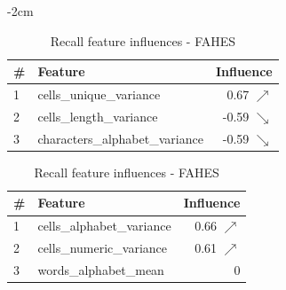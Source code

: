 \begin{table}[H]
	\centering
	\addtolength{\leftskip} {-2cm}
	\addtolength{\rightskip}{-2cm}
	\captionsetup[subtable]{position = below}
	\captionsetup[table]{position=top}
	\caption{Top feature influences - FAHES}
	\label{tab:feature_influences_FAHES}
		\begin{subtable}{0.5\linewidth}
		\centering
		\begin{tabular}{llr}
\toprule
 \# &                         Feature &         Influence \\
\midrule
 1 &         cells\_unique\_variance &   0.67 $\nearrow$ \\
 2 &         cells\_length\_variance &  -0.59 $\searrow$ \\
 3 &  characters\_alphabet\_variance &  -0.59 $\searrow$ \\
\bottomrule
\end{tabular}
		\caption{Precision feature influences - FAHES}
		\label{tab:prec_feature_influences_FAHES}
	\end{subtable}
	\hspace*{4em}
	\begin{subtable}{0.5\linewidth}
		\centering
		\begin{tabular}{llr}
\toprule
 \# &                    Feature &        Influence \\
\midrule
 1 &  cells\_alphabet\_variance &  0.66 $\nearrow$ \\
 2 &   cells\_numeric\_variance &  0.61 $\nearrow$ \\
 3 &      words\_alphabet\_mean &                0 \\
\bottomrule
\end{tabular}
		\caption{Recall feature influences - FAHES}
		\label{tab:rec_feature_influences_FAHES}
	\end{subtable}%
\end{table}



